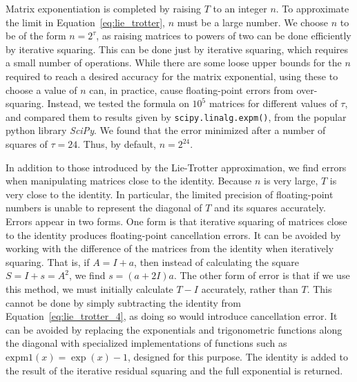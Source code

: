\documentclass{jors}
\begin{document}
		Matrix exponentiation is completed by raising $ T $ to an integer $ n $.
		To approximate the limit in Equation~\eqref{eq:lie_trotter}, $ n $ must be a large number.
		We choose $ n $ to be of the form $ n = 2^\tau $, as raising matrices to powers of two can be done efficiently by iterative squaring.
		This can be done just by iterative squaring, which requires a small number of operations.
		While there are some loose upper bounds for the $ n $ required to reach a desired accuracy for the matrix exponential\cite{suzuki_generalized_1976}, using these to choose a value of $ n $ can, in practice, cause floating-point errors from over-squaring.
		Instead, we tested the formula on $ 10^5 $ matrices for different values of $ \tau $, and compared them to results given by \texttt{scipy.linalg.expm()}, from the popular python library \emph{SciPy}\cite{virtanen_scipy_2020}.
		We found that the error minimized after a number of squares of $ \tau = 24 $.
		Thus, by default, $ n = 2^{24} $.

		In addition to those introduced by the Lie-Trotter approximation, we find errors when manipulating matrices close to the identity.
		Because $ n $ is very large, $ T $ is very close to the identity.
		In particular, the limited precision of floating-point numbers is unable to represent the diagonal of $ T $ and its squares accurately.
		Errors appear in two forms.
		One form is that iterative squaring of matrices close to the identity produces floating-point cancellation errors.
		It can be avoided by working with the difference of the matrices from the identity when iteratively squaring.
		That is, if $ A = I + a $, then instead of calculating the square $ S = I + s = A^2 $, we find $ s = (a + 2I)a $.
		The other form of error is that if we use this method, we must initially calculate $ T - I $ accurately, rather than $ T $.
		This cannot be done by simply subtracting the identity from Equation~\eqref{eq:lie_trotter_4}, as doing so would introduce cancellation error.
		It can be avoided by replacing the exponentials and trigonometric functions along the diagonal with specialized implementations of functions such as $ \mathrm{expm}1(x) = \exp(x) - 1 $, designed for this purpose\cite{hewlett-packard_hp_1994}.
		The identity is added to the result of the iterative residual squaring and the full exponential is returned.
		
\end{document}
